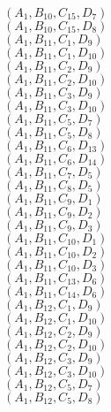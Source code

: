 \documentclass[14pt]{article}
\begin{document}
    $({A}_{1}, {B}_{10}, {C}_{15}, {D}_{7}) $ \\ 
    $({A}_{1}, {B}_{10}, {C}_{15}, {D}_{8}) $ \\ 
    $({A}_{1}, {B}_{11}, {C}_{1}, {D}_{9}) $ \\ 
    $({A}_{1}, {B}_{11}, {C}_{1}, {D}_{10}) $ \\ 
    $({A}_{1}, {B}_{11}, {C}_{2}, {D}_{9}) $ \\ 
    $({A}_{1}, {B}_{11}, {C}_{2}, {D}_{10}) $ \\ 
    $({A}_{1}, {B}_{11}, {C}_{3}, {D}_{9}) $ \\ 
    $({A}_{1}, {B}_{11}, {C}_{3}, {D}_{10}) $ \\ 
    $({A}_{1}, {B}_{11}, {C}_{5}, {D}_{7}) $ \\ 
    $({A}_{1}, {B}_{11}, {C}_{5}, {D}_{8}) $ \\ 
    $({A}_{1}, {B}_{11}, {C}_{6}, {D}_{13}) $ \\ 
    $({A}_{1}, {B}_{11}, {C}_{6}, {D}_{14}) $ \\ 
    $({A}_{1}, {B}_{11}, {C}_{7}, {D}_{5}) $ \\ 
    $({A}_{1}, {B}_{11}, {C}_{8}, {D}_{5}) $ \\ 
    $({A}_{1}, {B}_{11}, {C}_{9}, {D}_{1}) $ \\ 
    $({A}_{1}, {B}_{11}, {C}_{9}, {D}_{2}) $ \\ 
    $({A}_{1}, {B}_{11}, {C}_{9}, {D}_{3}) $ \\ 
    $({A}_{1}, {B}_{11}, {C}_{10}, {D}_{1}) $ \\ 
    $({A}_{1}, {B}_{11}, {C}_{10}, {D}_{2}) $ \\ 
    $({A}_{1}, {B}_{11}, {C}_{10}, {D}_{3}) $ \\ 
    $({A}_{1}, {B}_{11}, {C}_{13}, {D}_{6}) $ \\ 
    $({A}_{1}, {B}_{11}, {C}_{14}, {D}_{6}) $ \\ 
    $({A}_{1}, {B}_{12}, {C}_{1}, {D}_{9}) $ \\ 
    $({A}_{1}, {B}_{12}, {C}_{1}, {D}_{10}) $ \\ 
    $({A}_{1}, {B}_{12}, {C}_{2}, {D}_{9}) $ \\ 
    $({A}_{1}, {B}_{12}, {C}_{2}, {D}_{10}) $ \\ 
    $({A}_{1}, {B}_{12}, {C}_{3}, {D}_{9}) $ \\ 
    $({A}_{1}, {B}_{12}, {C}_{3}, {D}_{10}) $ \\ 
    $({A}_{1}, {B}_{12}, {C}_{5}, {D}_{7}) $ \\ 
    $({A}_{1}, {B}_{12}, {C}_{5}, {D}_{8}) $ \\ 
\end{document}
